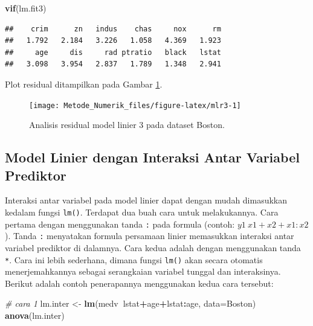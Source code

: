 \documentclass[]{book}
\newenvironment{Shaded}{\begin{snugshade}}{\end{snugshade}}
\newcommand{\CommentTok}[1]{\textcolor[rgb]{0.56,0.35,0.01}{\textit{#1}}}
\newcommand{\DataTypeTok}[1]{\textcolor[rgb]{0.13,0.29,0.53}{#1}}
\newcommand{\KeywordTok}[1]{\textcolor[rgb]{0.13,0.29,0.53}{\textbf{#1}}}
\newcommand{\NormalTok}[1]{#1}
\newcommand{\OperatorTok}[1]{\textcolor[rgb]{0.81,0.36,0.00}{\textbf{#1}}}
\newcommand{\StringTok}[1]{\textcolor[rgb]{0.31,0.60,0.02}{#1}}
\theoremstyle{definition}
\theoremstyle{definition}
\theoremstyle{definition}
\theoremstyle{remark}
\begin{document}
\begin{Shaded}
\begin{Highlighting}[]
\KeywordTok{vif}\NormalTok{(lm.fit3)}
\end{Highlighting}
\end{Shaded}

\begin{verbatim}
##    crim      zn   indus    chas     nox      rm 
##   1.792   2.184   3.226   1.058   4.369   1.923 
##     age     dis     rad ptratio   black   lstat 
##   3.098   3.954   2.837   1.789   1.348   2.941
\end{verbatim}

Plot residual ditampilkan pada Gambar \ref{fig:mlr3}.

\begin{figure}

{\centering \texttt{[image: Metode\_Numerik\_files/figure-latex/mlr3-1]} 

}

\caption{Analisis residual model linier 3 pada dataset Boston.}\label{fig:mlr3}
\end{figure}

\hypertarget{lminter}{%
\subsection{Model Linier dengan Interaksi Antar Variabel Prediktor}\label{lminter}}

Interaksi antar variabel pada model linier dapat dengan mudah dimasukkan kedalam fungsi \texttt{lm()}. Terdapat dua buah cara untuk melakukannya. Cara pertama dengan menggunakan tanda \texttt{:} pada formula (contoh: \(y1 ~ x1+x2+x1:x2\)). Tanda \texttt{:} menyatakan formula persamaan linier memasukkan interaksi antar variabel prediktor di dalamnya. Cara kedua adalah dengan menggunakan tanda \texttt{*}. Cara ini lebih sederhana, dimana fungsi \texttt{lm()} akan secara otomatis menerjemahkannya sebagai serangkaian variabel tunggal dan interaksinya. Berikut adalah contoh penerapannya menggunakan kedua cara tersebut:

\begin{Shaded}
\begin{Highlighting}[]
\CommentTok{# cara 1}
\NormalTok{lm.inter <-}\StringTok{ }\KeywordTok{lm}\NormalTok{(medv}\OperatorTok{~}\NormalTok{lstat}\OperatorTok{+}\NormalTok{age}\OperatorTok{+}\NormalTok{lstat}\OperatorTok{:}\NormalTok{age, }\DataTypeTok{data=}\NormalTok{Boston)}
\KeywordTok{anova}\NormalTok{(lm.inter)}
\end{Highlighting}
\end{Shaded}
\end{document}
